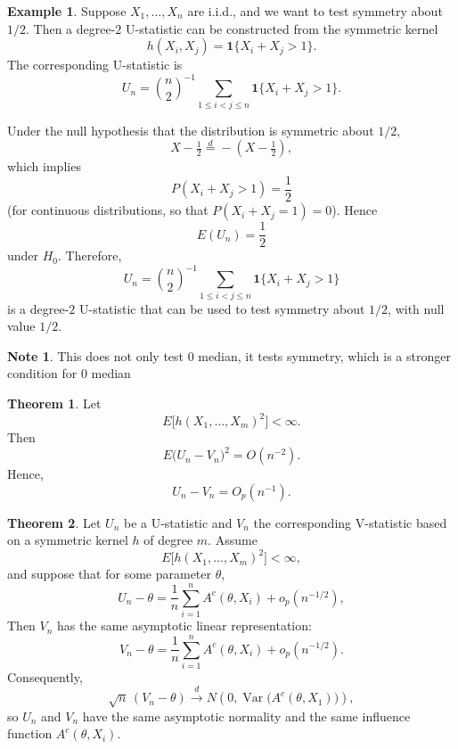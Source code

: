 \documentclass[11pt]{article}
\theoremstyle{definition}
\newtheorem{note}{Note}[section]
\newtheorem{exmp}{Example}[section]
\newtheorem{theo}{Theorem}[section]
\begin{document}
\begin{exmp}
    Suppose \(X_1,\dots,X_n\) are i.i.d., and we want to test symmetry about \(1/2\).  
Then a degree-\(2\) U-statistic can be constructed from the symmetric kernel
\[
h(X_i,X_j)=\mathbf 1\{X_i+X_j>1\}.
\]
The corresponding U-statistic is
\[
U_n=\binom{n}{2}^{-1}\sum_{1\le i<j\le n}\mathbf 1\{X_i+X_j>1\}.
\]

Under the null hypothesis that the distribution is symmetric about \(1/2\),
\[
X-\tfrac12 \overset{d}= -(X-\tfrac12),
\]
which implies
\[
P(X_i+X_j>1)=\frac12
\]
(for continuous distributions, so that \(P(X_i+X_j=1)=0\)). Hence
\[
E(U_n)=\frac12
\]
under \(H_0\).
Therefore,
\[
U_n=\binom{n}{2}^{-1}\sum_{1\le i<j\le n}\mathbf 1\{X_i+X_j>1\}
\]
is a degree-\(2\) U-statistic that can be used to test symmetry about \(1/2\), with null value \(1/2\).
\end{exmp}
\begin{note}
    This does not only test 0 median, it tests symmetry, which is a stronger condition for 0 median
\end{note}
\begin{theo}
Let
\[
E\bigl[h(X_1,\dots,X_m)^2\bigr]<\infty.
\]
Then
\[
E\bigl(U_n-V_n\bigr)^2=O\!\left(n^{-2}\right).
\]
Hence,
\[
U_n-V_n=O_p(n^{-1}).
\]
\end{theo}
\begin{theo}
Let \(U_n\) be a U-statistic and \(V_n\) the corresponding V-statistic based on a symmetric kernel \(h\) of degree \(m\). Assume
\[
E\bigl[h(X_1,\dots,X_m)^2\bigr]<\infty,
\]
and suppose that for some parameter \(\theta\),
\[
U_n-\theta=\frac1n\sum_{i=1}^n A^c(\theta,X_i)+o_p(n^{-1/2}),
\]
Then \(V_n\) has the same asymptotic linear representation:
\[
V_n-\theta=\frac1n\sum_{i=1}^n A^c(\theta,X_i)+o_p(n^{-1/2}).
\]
Consequently,
\[
\sqrt n\,(V_n-\theta)\xrightarrow{d}N\!\left(0,\operatorname{Var}\!\bigl(A^c(\theta,X_1)\bigr)\right),
\]
so \(U_n\) and \(V_n\) have the same asymptotic normality and the same influence function \(A^c(\theta,X_i)\).
\end{theo}
\end{document}
